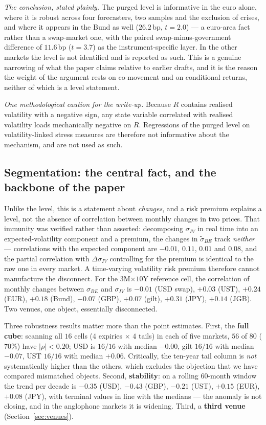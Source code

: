 \documentclass[11pt]{article}
\newcommand{\sBE}{\sigma_{BE}}
\newcommand{\sIV}{\sigma_{IV}}
\begin{document}
\emph{The conclusion, stated plainly.} The purged level is informative in the euro alone, where it
is robust across four forecasters, two samples and the exclusion of crises, and where it appears in
the Bund as well ($26.2$\,bp, $t=2.0$) --- a euro-area fact rather than a swap-market one, with the
paired swap-minus-government difference of $11.6$\,bp ($t=3.7$) as the instrument-specific layer. In
the other markets the level is not identified and is reported as such. This is a genuine narrowing
of what the paper claims relative to earlier drafts, and it is the reason the weight of the argument
rests on co-movement and on conditional returns, neither of which is a level statement.

\emph{One methodological caution for the write-up.} Because $R$ contains realised volatility with a
negative sign, any state variable correlated with realised volatility loads mechanically negative on
$R$. Regressions of the purged level on volatility-linked stress measures are therefore not
informative about the mechanism, and are not used as such.

\subsection{Segmentation: the central fact, and the backbone of the paper}\label{sec:c3}
Unlike the level, this is a statement about \emph{changes}, and a risk premium explains a level, not
the absence of correlation between monthly changes in two prices. That immunity was verified rather
than asserted: decomposing $\sigma_{IV}$ in real time into an expected-volatility component and a
premium, the changes in $\tilde\sigma_{BE}$ track \emph{neither} --- correlations with the expected
component are $-0.01$, $0.11$, $0.01$ and $0.08$, and the partial correlation with
$\Delta\sigma_{IV}$ controlling for the premium is identical to the raw one in every market. A
time-varying volatility risk premium therefore cannot manufacture the disconnect.
For the $3$M$\times$$10$Y reference cell, the correlation of monthly changes between $\sBE$ and $\sIV$
is $-0.01$ (USD swap), $+0.03$ (UST), $+0.24$ (EUR), $+0.18$ (Bund), $-0.07$ (GBP), $+0.07$ (gilt),
$+0.31$ (JPY), $+0.14$ (JGB). Two venues, one object, essentially disconnected.

Three robustness results matter more than the point estimates. First, the \textbf{full cube}: scanning
all $16$ cells ($4$ expiries $\times$ $4$ tails) in each of five markets, $56$ of $80$ ($70\%$) have
$|\rho|<0.20$; USD is $16/16$ with median $-0.00$, gilt $16/16$ with median $-0.07$, UST $16/16$ with
median $+0.06$. Critically, the ten-year tail column is \emph{not} systematically higher than the
others, which excludes the objection that we have compared mismatched objects. Second,
\textbf{stability}: on a rolling 60-month window the trend per decade is $-0.35$ (USD), $-0.43$ (GBP),
$-0.21$ (UST), $+0.15$ (EUR), $+0.08$ (JPY), with terminal values in line with the medians --- the
anomaly is not closing, and in the anglophone markets it is widening. Third, a \textbf{third venue}
(Section~\ref{sec:venues}).
\end{document}
